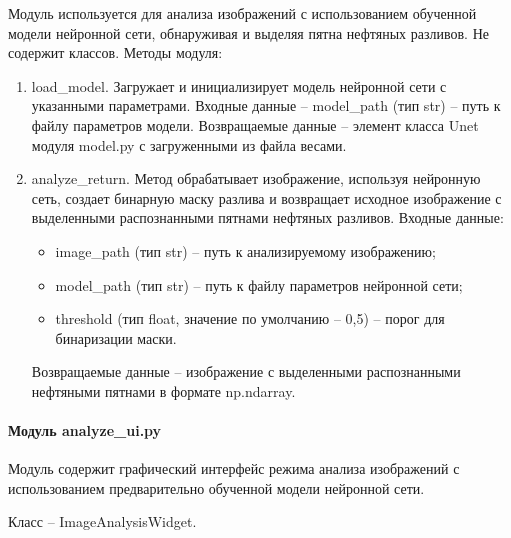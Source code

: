 Модуль используется для анализа изображений с использованием обученной модели нейронной сети, обнаруживая и выделяя пятна нефтяных разливов.  Не содержит классов. Методы модуля:
\begin{enumerate}
	\item load\_model. Загружает и инициализирует модель нейронной сети с указанными параметрами. Входные данные -- model\_path (тип str) -- путь к файлу параметров модели. Возвращаемые данные -- элемент класса Unet модуля model.py с загруженными из файла весами.
	\item analyze\_return. Метод обрабатывает изображение, используя нейронную сеть, создает бинарную маску разлива и возвращает исходное изображение с выделенными распознанными пятнами нефтяных разливов. Входные данные:
	\begin{itemize}
		\item image\_path (тип str) -- путь к анализируемому изображению;
		\item model\_path (тип str) -- путь к файлу параметров нейронной сети;
		\item threshold (тип float, значение по умолчанию -- 0,5) -- порог для бинаризации маски.
	\end{itemize}
	Возвращаемые данные -- изображение с выделенными распознанными нефтяными пятнами в формате np.ndarray.
\end{enumerate}

\paragraph{Модуль analyze\_ui.py}

Модуль содержит графический интерфейс режима анализа изображений с использованием предварительно обученной модели нейронной сети.

Класс -- ImageAnalysisWidget. 

